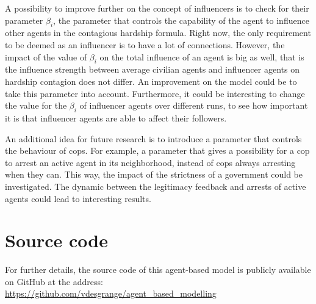 \documentclass[10pt]{article}
\begin{document}




    A possibility to improve further on the concept of influencers is to check for their parameter $\beta_i$, the parameter that controls the capability of the agent to influence other agents in the contagious hardship formula. Right now, the only requirement to be deemed as an influencer is to have a lot of connections. However, the impact of the value of $\beta_i$ on the total influence of an agent is big as well, that is the influence strength between average civilian agents and influencer agents on hardship contagion does not differ. An improvement on the model could be to take this parameter into account. Furthermore, it could be interesting to change the value for the $\beta_i$ of influencer agents over different runs, to see how important it is that influencer agents are able to affect their followers.

    An additional idea for future research is to introduce a parameter that controls the behaviour of cops. For example, a parameter that gives a possibility for a cop to arrest an active agent in its neighborhood, instead of cops always arresting when they can. This way, the impact of the strictness of a government could be investigated. The dynamic between the legitimacy feedback and arrests of active agents could lead to interesting results.

    \section*{Source code}

    For further details, the source code of this agent-based model is publicly available on GitHub at the address: \url{https://github.com/vdesgrange/agent_based_modelling}
\end{document}
